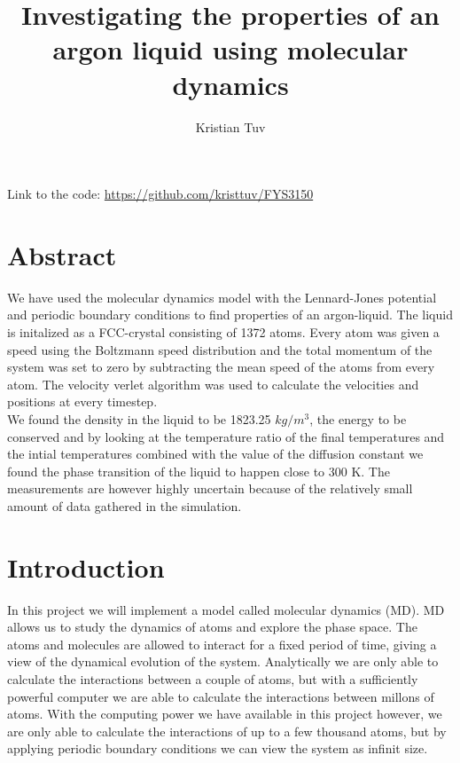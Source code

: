 \documentclass[a4paper, 12pt]{article}
\begin{document}
\author{Kristian Tuv}
\title{Investigating the properties of an argon liquid using molecular dynamics}
\maketitle
Link to the code: \url{https://github.com/kristtuv/FYS3150}
\newpage
\tableofcontents
\newpage
\section{Abstract}
We have used the molecular dynamics model with the Lennard-Jones potential and periodic boundary conditions to find properties of an argon-liquid. The liquid is initalized as a FCC-crystal consisting of 1372 atoms. Every atom was given a speed using the Boltzmann speed distribution and the total momentum of the system was set to zero by subtracting the mean speed of the atoms from every atom. The velocity verlet algorithm was used to calculate the velocities and positions at every timestep.\\

We found the density in the liquid to be 1823.25 $kg/m^3$, the energy to be conserved and by looking at the temperature ratio of the final temperatures and the intial temperatures combined with the value of the diffusion constant we found the phase transition of the liquid to happen close to 300 K. The measurements are however highly uncertain because of the relatively small amount of data gathered in the simulation.

\section{Introduction}


In this project we will implement a model called molecular dynamics (MD). MD  allows us to study the dynamics of atoms and explore the phase space. The atoms and molecules are allowed to interact for a fixed	period of time, giving a view of the dynamical evolution of the system. Analytically we are only able to calculate the interactions between a couple of atoms, but with a sufficiently powerful computer we are able to calculate the interactions between millons of atoms. With the computing power we have available in this project however, we are only able to calculate the interactions of up to a few thousand atoms, but by applying periodic boundary conditions we can view the system as infinit size.\\
\end{document}
